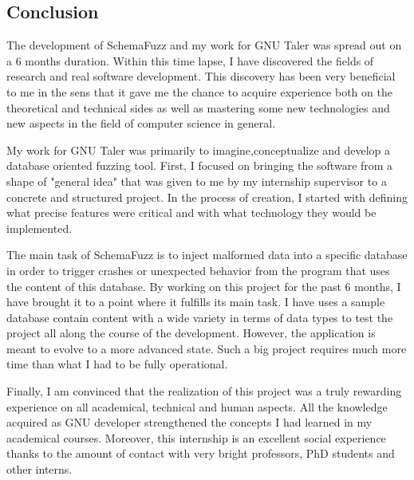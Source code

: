 	\clearpage

	\subsection{Conclusion}
   
The development of SchemaFuzz and my work for GNU Taler was spread out on a 6 months duration.
Within this time lapse, I have discovered the fields of research and real software development.
This discovery has been very beneficial to me in the sens that it gave me the chance to acquire experience both on the theoretical and technical sides as well as mastering some new technologies and new aspects in the field of computer science in general.

My work for GNU Taler was primarily to imagine,conceptualize and develop a database oriented fuzzing tool. 
First, I focused on bringing the software from a shape of "general idea" that was given to me by my internship supervisor to a concrete and structured project. In the process of creation, I started with defining what precise features were critical and with what technology they would be implemented.

The main task of SchemaFuzz is to inject malformed data into a specific database in order to trigger crashes or unexpected behavior from the program that uses the content of this database.
By working on this project for the past 6 months, I have brought it to a point where it fulfills its main task. I have uses a sample database contain content with a wide variety in terms of data types to test the project all along the course of the development. However, the application is meant to evolve to a more advanced state. Such a big project requires much more time than what I had to be fully operational.

Finally, I am convinced that the realization of this project was a truly rewarding experience on all academical, technical and human aspects. All the knowledge acquired as GNU developer strengthened the concepts I had learned in my academical courses. Moreover, this internship is an excellent social experience thanks to the amount of contact with very bright professors, PhD students and other interns.     
   
